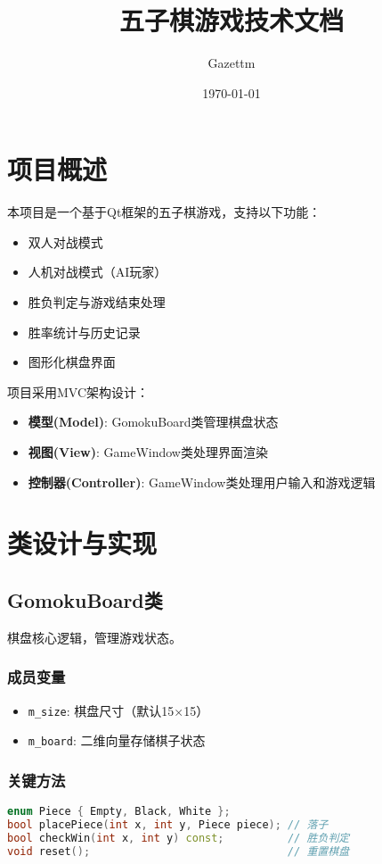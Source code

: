 \documentclass[UTF8]{ctexart}
\title{五子棋游戏技术文档}
\author{Gazettm}
\date{\today}
\begin{document}
\maketitle
\tableofcontents

\section{项目概述}
本项目是一个基于Qt框架的五子棋游戏，支持以下功能：
\begin{itemize}
    \item 双人对战模式
    \item 人机对战模式（AI玩家）
    \item 胜负判定与游戏结束处理
    \item 胜率统计与历史记录
    \item 图形化棋盘界面
\end{itemize}

项目采用MVC架构设计：
\begin{itemize}
    \item \textbf{模型(Model)}: GomokuBoard类管理棋盘状态
    \item \textbf{视图(View)}: GameWindow类处理界面渲染
    \item \textbf{控制器(Controller)}: GameWindow类处理用户输入和游戏逻辑
\end{itemize}

\section{类设计与实现}
\subsection{GomokuBoard类}
棋盘核心逻辑，管理游戏状态。

\subsubsection{成员变量}
\begin{itemize}
    \item \texttt{m\_size}: 棋盘尺寸（默认15×15）
    \item \texttt{m\_board}: 二维向量存储棋子状态
\end{itemize}

\subsubsection{关键方法}
\begin{lstlisting}[language=C++, caption=gomokuboard.h]
enum Piece { Empty, Black, White };
bool placePiece(int x, int y, Piece piece); // 落子
bool checkWin(int x, int y) const;          // 胜负判定
void reset();                               // 重置棋盘
\end{lstlisting}
\end{document}
